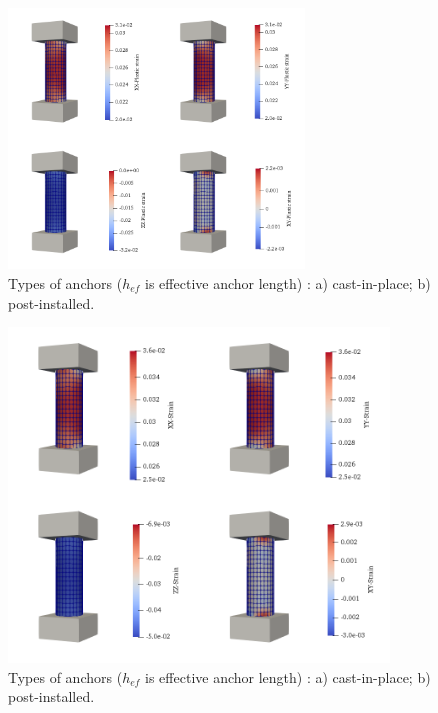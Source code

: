 \begin{figure}[h!]
	\centering
	\includegraphics[width=0.7\textwidth]{obrazky/compression_zpevneni_pl_strain.png}
	\caption[Types of anchors]{Types of anchors ($h_{ef}$ is effective anchor length) \cite{anchors-ACI-318M}: a) cast-in-place; b) post-installed.}\label{obr:Compresion_plastic_srain}
\end{figure}


\begin{figure}[h!]
	\centering
	\includegraphics[width=0.9\textwidth]{obrazky/compression_zpevneni_strain.png}
	\caption[Types of anchors]{Types of anchors ($h_{ef}$ is effective anchor length) \cite{anchors-ACI-318M}: a) cast-in-place; b) post-installed.}\label{obr:Compresion_total_strain}
\end{figure}


